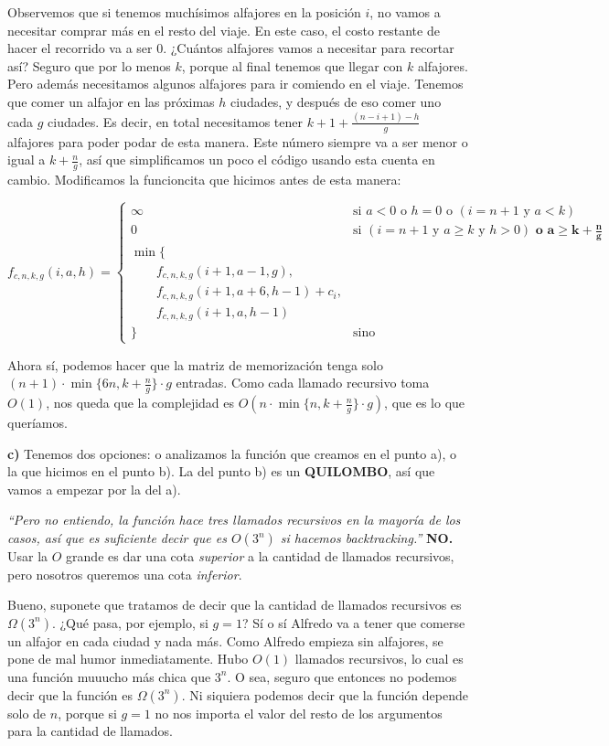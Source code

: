 \documentclass{article}
\begin{document}
Observemos que si tenemos muchísimos alfajores en la posición $i$, no vamos a necesitar comprar más en el resto del viaje. En este caso, el costo restante de hacer el recorrido va a ser 0. ¿Cuántos alfajores vamos a necesitar para recortar así? Seguro que por lo menos $k$, porque al final tenemos que llegar con $k$ alfajores. Pero además necesitamos algunos alfajores para ir comiendo en el viaje. Tenemos que comer un alfajor en las próximas $h$ ciudades, y después de eso comer uno cada $g$ ciudades. Es decir, en total necesitamos tener $k + 1 + \frac{(n - i + 1) - h}{g}$ alfajores para poder podar de esta manera. Este número siempre va a ser menor o igual a $k + \frac{n}{g}$, así que simplificamos un poco el código usando esta cuenta en cambio. Modificamos la funcioncita que hicimos antes de esta manera:

\[
f_{c,n,k,g}(i,a,h) = \begin{cases}
\infty & \text{si } a < 0 \text{ o } h = 0 \text{ o } (i = n+1 \text{ y } a < k)\\
0 & \text{si } (i = n+1 \text{ y } a \geq k \text{ y } h > 0) \mathbf{\textbf{ o } a \geq k + \frac{n}{g}}\\
\min\{\\
\qquad f_{c,n,k,g}(i+1,a-1,g),\\
\qquad f_{c,n,k,g}(i+1,a+6,h-1) + c_i,\\
\qquad f_{c,n,k,g}(i+1,a,h-1)\\
\} & \text{sino}
\end{cases}
\]

Ahora sí, podemos hacer que la matriz de memorización tenga solo $(n+1) \cdot \min\{6n, k + \frac{n}{g}\}\cdot g$ entradas. Como cada llamado recursivo toma $O(1)$, nos queda que la complejidad es $O(n \cdot \min\{n, k + \frac{n}{g}\}\cdot g)$, que es lo que queríamos.

\textbf{c)} Tenemos dos opciones: o analizamos la función que creamos en el punto a), o la que hicimos en el punto b). La del punto b) es un \textbf{QUILOMBO}, así que vamos a empezar por la del a).

\emph{``Pero no entiendo, la función hace tres llamados recursivos en la mayoría de los casos, así que es suficiente decir que es $O(3^n)$ si hacemos backtracking.''} \textbf{NO.} Usar la $O$ grande es dar una cota \emph{superior} a la cantidad de llamados recursivos, pero nosotros queremos una cota \emph{inferior}. 

Bueno, suponete que tratamos de decir que la cantidad de llamados recursivos es $\Omega(3^n)$. ¿Qué pasa, por ejemplo, si $g=1$? Sí o sí Alfredo va a tener que comerse un alfajor en cada ciudad y nada más. Como Alfredo empieza sin alfajores, se pone de mal humor inmediatamente. Hubo $O(1)$ llamados recursivos, lo cual es una función muuucho más chica que $3^n$. O sea, seguro que entonces no podemos decir que la función es $\Omega(3^n)$. Ni siquiera podemos decir que la función depende solo de $n$, porque si $g=1$ no nos importa el valor del resto de los argumentos para la cantidad de llamados.
\end{document}
